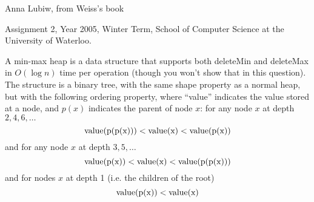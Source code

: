 \begin{authorship} Anna Lubiw, from Weiss's book
\end{authorship}
\begin{usage}
Assignment 2, Year 2005, Winter Term, School of Computer Science at the University of Waterloo.
\end{usage}

A min-max heap is a data structure that supports both deleteMin and
deleteMax in $O(\log n)$ time per operation (though you won't show that
in this question).  
%
The structure is a binary tree, with the same shape property as a
normal heap, but with the following ordering property, where ``value''
indicates the value stored at a node, and $p(x)$ indicates the parent
of node $x$: for any node $x$ at depth $2, 4, 6, \ldots$ $$
\rm{value}(p(p(x))) < \rm{value}(x) < \rm{value}(p(x))$$
%
and for any node $x$ at depth $3, 5, \ldots$
%
$$ \rm{value}(p(x)) < \rm{value}(x) < \rm{value}(p(p(x)))$$
%
and for nodes $x$ at depth 1 (i.e. the children of the root)
%
$$\rm{value}(p(x)) < \rm{value}(x)$$
%

